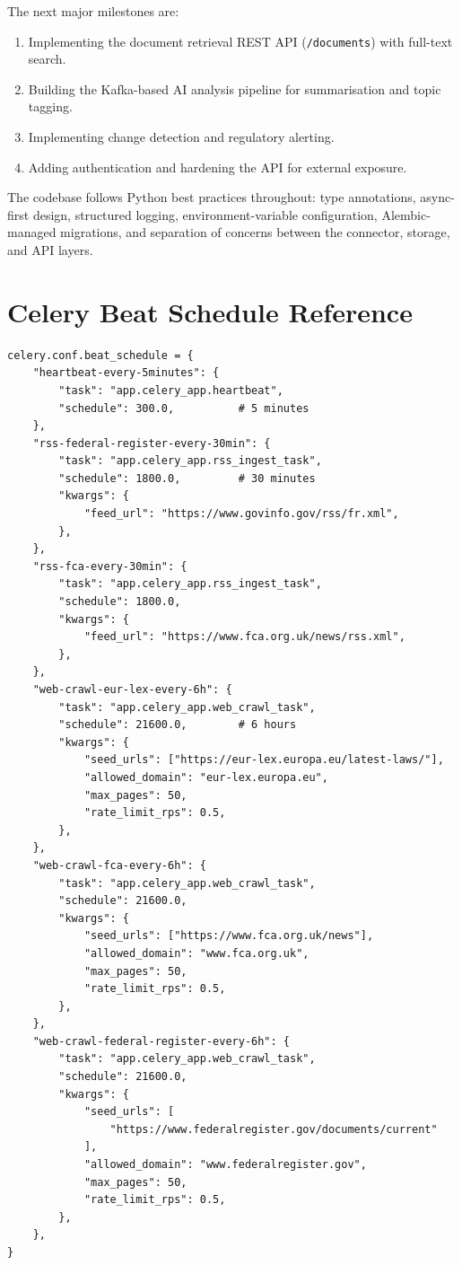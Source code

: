 \documentclass[12pt,a4paper]{article}
\begin{document}
The next major milestones are:
\begin{enumerate}[noitemsep]
  \item Implementing the document retrieval REST API (\texttt{/documents}) with full-text search.
  \item Building the Kafka-based AI analysis pipeline for summarisation and topic tagging.
  \item Implementing change detection and regulatory alerting.
  \item Adding authentication and hardening the API for external exposure.
\end{enumerate}

The codebase follows Python best practices throughout: type annotations, async-first design, structured logging, environment-variable configuration, Alembic-managed migrations, and separation of concerns between the connector, storage, and API layers.

\appendix
\section{Celery Beat Schedule Reference}

\begin{lstlisting}[caption={Full Celery Beat schedule (app/celery\_app.py)}]
celery.conf.beat_schedule = {
    "heartbeat-every-5minutes": {
        "task": "app.celery_app.heartbeat",
        "schedule": 300.0,          # 5 minutes
    },
    "rss-federal-register-every-30min": {
        "task": "app.celery_app.rss_ingest_task",
        "schedule": 1800.0,         # 30 minutes
        "kwargs": {
            "feed_url": "https://www.govinfo.gov/rss/fr.xml",
        },
    },
    "rss-fca-every-30min": {
        "task": "app.celery_app.rss_ingest_task",
        "schedule": 1800.0,
        "kwargs": {
            "feed_url": "https://www.fca.org.uk/news/rss.xml",
        },
    },
    "web-crawl-eur-lex-every-6h": {
        "task": "app.celery_app.web_crawl_task",
        "schedule": 21600.0,        # 6 hours
        "kwargs": {
            "seed_urls": ["https://eur-lex.europa.eu/latest-laws/"],
            "allowed_domain": "eur-lex.europa.eu",
            "max_pages": 50,
            "rate_limit_rps": 0.5,
        },
    },
    "web-crawl-fca-every-6h": {
        "task": "app.celery_app.web_crawl_task",
        "schedule": 21600.0,
        "kwargs": {
            "seed_urls": ["https://www.fca.org.uk/news"],
            "allowed_domain": "www.fca.org.uk",
            "max_pages": 50,
            "rate_limit_rps": 0.5,
        },
    },
    "web-crawl-federal-register-every-6h": {
        "task": "app.celery_app.web_crawl_task",
        "schedule": 21600.0,
        "kwargs": {
            "seed_urls": [
                "https://www.federalregister.gov/documents/current"
            ],
            "allowed_domain": "www.federalregister.gov",
            "max_pages": 50,
            "rate_limit_rps": 0.5,
        },
    },
}
\end{lstlisting}
\end{document}
